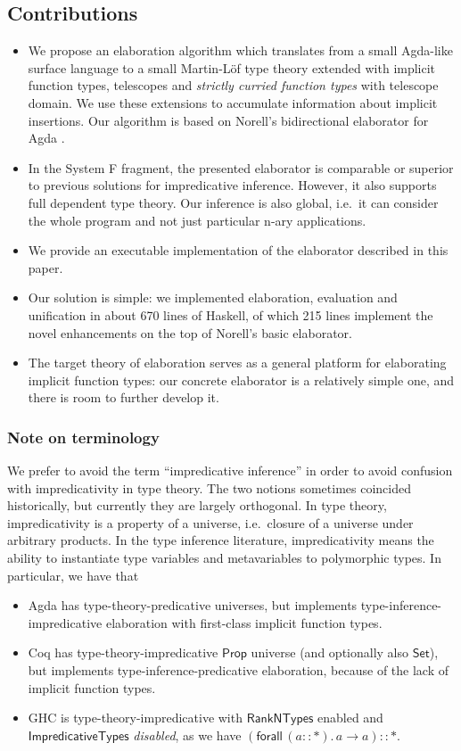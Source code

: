 \documentclass[acmsmall,review,anonymous,prologue,dvipsnames]{acmart}\settopmatter{printfolios=true,printccs=false,printacmref=false}
\newcommand{\kw}[1]{{\mathsf{#1}}}
\theoremstyle{remark}
\begin{document}
\subsection{Contributions}
\begin{itemize}
  \item We propose an elaboration algorithm which translates from a small
    Agda-like surface language to a small Martin-L\"of type theory extended with
    implicit function types, telescopes and \emph{strictly curried function
      types} with telescope domain. We use these extensions to accumulate
    information about implicit insertions. Our algorithm is based on Norell's
    bidirectional elaborator for Agda \cite[Chapter~3]{norell07thesis}.
  \item
    In the System F fragment, the presented elaborator is comparable or superior
    to previous solutions for impredicative inference. However, it also supports
    full dependent type theory. Our inference is also global, i.e.\ it can
    consider the whole program and not just particular n-ary applications.
  \item We provide an executable implementation of the elaborator described in
    this paper.
  \item Our solution is simple: we implemented elaboration,
    evaluation and unification in about 670 lines of Haskell, of which 215 lines
    implement the novel enhancements on the top of Norell's basic elaborator.
  \item The target theory of elaboration serves as a general platform for
    elaborating implicit function types: our concrete elaborator is a relatively
    simple one, and there is room to further develop it.
\end{itemize}

\subsubsection{Note on terminology}

We prefer to avoid the term ``impredicative inference'' in order to avoid
confusion with impredicativity in type theory. The two notions sometimes
coincided historically, but currently they are largely orthogonal. In type
theory, impredicativity is a property of a universe, i.e.\ closure of a universe
under arbitrary products. In the type inference literature, impredicativity
means the ability to instantiate type variables and metavariables to polymorphic
types. In particular, we have that
\begin{itemize}
  \item Agda has type-theory-predicative universes, but implements
    type-inference-impredicative elaboration with first-class implicit function
    types.
  \item Coq has type-theory-impredicative $\kw{Prop}$ universe (and optionally
    also $\kw{Set}$), but implements type-inference-predicative elaboration,
    because of the lack of implicit function types.
  \item GHC is type-theory-impredicative with $\kw{RankNTypes}$ enabled and
    $\kw{ImpredicativeTypes}$ \emph{disabled}, as we have $(\kw{forall}\,(a :: *).\, a
    \to a) :: *$.
\end{itemize}
\end{document}
